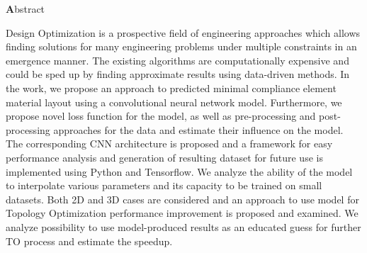 
\clearemptydoublepage
{}
{}

\vspace*{2cm}
\begin{center}
{\Large \textbf Abstract}
\end{center}
\vspace{1cm}

Design Optimization is a prospective field of engineering approaches which allows finding solutions for many engineering problems under multiple constraints in an emergence manner.
The existing algorithms are computationally expensive and could be sped up by finding approximate results using data-driven methods.
In the work, we propose an approach to predicted minimal compliance element material layout using a convolutional neural network model.
Furthermore, we propose novel loss function for the model, as well as pre-processing and post-processing approaches for the data and estimate their influence on the model.
The corresponding CNN architecture is proposed and a framework for easy performance analysis and generation of resulting dataset for future use is implemented using Python and Tensorflow.
We analyze the ability of the model to interpolate various parameters and its capacity to be trained on small datasets. 
Both 2D and 3D cases are considered and an approach to use model for Topology Optimization performance improvement is proposed and examined.
We analyze possibility to use model-produced results as an educated guess for further TO process and estimate the speedup.

